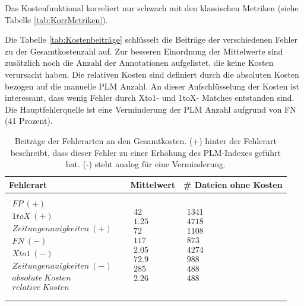 Das Kostenfunktional korreliert nur schwach mit den klassischen Metriken (siehe Tabelle \ref{tab:KorrMetriken}).

Die Tabelle \ref{tab:Kostenbeiträge} schlüsselt die Beiträge der verschiedenen Fehler zu der Gesamtkostenzahl auf.
Zur besseren Einordnung der Mittelwerte sind zusätzlich noch die Anzahl der Annotationen aufgelistet, die keine Kosten verursacht haben. Die relativen Kosten sind definiert durch die absoluten Kosten bezogen auf die manuelle PLM Anzahl.
An dieser Aufschlüsselung der Kosten ist interessant, dass wenig Fehler durch Xto1- und 1toX- Matches entstanden sind.
Die Hauptfehlerquelle ist eine Verminderung der PLM Anzahl aufgrund von \gls{FN} (41 Prozent).

\begin{table}[!ht]
\caption{Beiträge der Fehlerarten an den Gesamtkosten. (+) hinter der Fehlerart beschreibt, dass dieser Fehler zu einer Erhöhung des PLM-Indexes geführt hat. (-) steht analog für eine Verminderung.}
	\centering
		\begin{tabular}{lll}
			\hline Fehlerart & Mittelwert & \# Dateien ohne Kosten\\
			\hline {$\!\begin{aligned}
				&\\
				FP\ (+)\\
				1toX\ (+)\\
				Zeitungenauigkeiten\ (+)\\
				FN\ (-)\\
    			Xto1\ (-)\\
				Zeitungenauigkeiten\ (-)\\
				absolute\ Kosten\\
				relative\ Kosten\\
			
				&\\
				\end{aligned}$} & {$\!\begin{aligned}
				&\\
				42\\
				1.25\\
				72\\
				117\\
				2.05\\
				72.9\\
				285\\
				2.26\\
				&\\
				\end{aligned}$} & {$\!\begin{aligned}
				&\\
				1341\\
				4718\\
				1108\\
				873\\
				4274\\
				988\\
				488\\
				488\\
				&\\
				\end{aligned}$}\\
				\hline
		\end{tabular}


\end{table}
